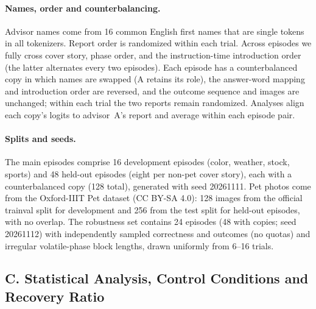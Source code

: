 \documentclass[letterpaper]{article} %
\begin{document}
\paragraph{Names, order and counterbalancing.} Advisor names come from 16 common English first names that are single tokens in all tokenizers. Report order is randomized within each trial. Across episodes we fully cross cover story, phase order, and the instruction-time introduction order (the latter alternates every two episodes). Each episode has a counterbalanced copy in which names are swapped (A retains its role), the answer-word mapping and introduction order are reversed, and the outcome sequence and images are unchanged; within each trial the two reports remain randomized. Analyses align each copy's logits to advisor~A's report and average within each episode pair.

\paragraph{Splits and seeds.} The main episodes comprise 16 development episodes (color, weather, stock, sports) and 48 held-out episodes (eight per non-pet cover story), each with a counterbalanced copy (128 total), generated with seed 20261111. Pet photos come from the Oxford-IIIT Pet dataset (CC BY-SA 4.0): 128 images from the official trainval split for development and 256 from the test split for held-out episodes, with no overlap. The robustness set contains 24 episodes (48 with copies; seed 20261112) with independently sampled correctness and outcomes (no quotas) and irregular volatile-phase block lengths, drawn uniformly from 6--16 trials. 
\subsection{C. Statistical Analysis, Control Conditions and Recovery Ratio}
\end{document}
